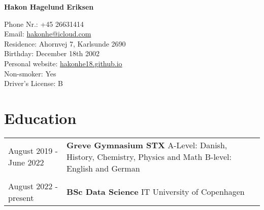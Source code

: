 \documentclass[12pt]{article}
\begin{document}
\begin{center}
     \Huge{\textbf{Hakon Hagelund Eriksen}}
\end{center}
Phone Nr.: \hfill +45 26631414\\
Email:  \hfill \href{mailto:hakonhe@icloud.com}{hakonhe@icloud.com} \\ 
Residence: \hfill Ahornvej 7, Karlsunde 2690 \\
Birthday: \hfill December 18th 2002 \\
Personal website: \hfill \href{hakonhe18.github.io}{hakonhe18.github.io} \\
Non-smoker: \hfill Yes \\
Driver's License: \hfill B


\section{Education}
\begin{tabular}{ l p{6in} }
August 2019 -  June 2022 & \textbf{Greve Gymnasium STX } \newline A-Level: Danish, History, Chemistry, Physics and Math \newline B-level: English and German \\
& \\
August 2022 - present & \textbf{BSc Data Science} \newline IT University of Copenhagen \\ 
\end{tabular}
\end{document}
